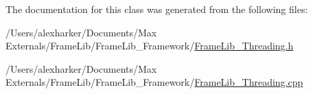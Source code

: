 The documentation for this class was generated from the following files\+:\begin{DoxyCompactItemize}
\item 
/\+Users/alexharker/\+Documents/\+Max Externals/\+Frame\+Lib/\+Frame\+Lib\+\_\+\+Framework/\hyperlink{_frame_lib___threading_8h}{Frame\+Lib\+\_\+\+Threading.\+h}\item 
/\+Users/alexharker/\+Documents/\+Max Externals/\+Frame\+Lib/\+Frame\+Lib\+\_\+\+Framework/\hyperlink{_frame_lib___threading_8cpp}{Frame\+Lib\+\_\+\+Threading.\+cpp}\end{DoxyCompactItemize}
